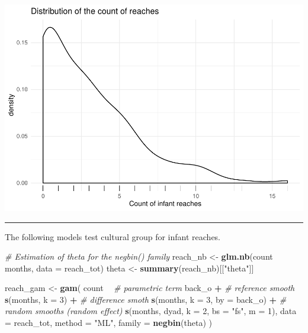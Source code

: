 \documentclass[]{article}
\newenvironment{Shaded}{\begin{snugshade}}{\end{snugshade}}
\newcommand{\CommentTok}[1]{\textcolor[rgb]{0.56,0.35,0.01}{\textit{#1}}}
\newcommand{\DataTypeTok}[1]{\textcolor[rgb]{0.13,0.29,0.53}{#1}}
\newcommand{\DecValTok}[1]{\textcolor[rgb]{0.00,0.00,0.81}{#1}}
\newcommand{\KeywordTok}[1]{\textcolor[rgb]{0.13,0.29,0.53}{\textbf{#1}}}
\newcommand{\NormalTok}[1]{#1}
\newcommand{\OperatorTok}[1]{\textcolor[rgb]{0.81,0.36,0.00}{\textbf{#1}}}
\newcommand{\StringTok}[1]{\textcolor[rgb]{0.31,0.60,0.02}{#1}}
\begin{document}
\includegraphics{supplement_files/figure-latex/reaches-1.pdf}

\begin{center}\rule{0.5\linewidth}{\linethickness}\end{center}

The following models test cultural group for infant reaches.

\begin{Shaded}
\begin{Highlighting}[]
\CommentTok{# Estimation of theta for the negbin() family}
\NormalTok{reach_nb <-}\StringTok{ }\KeywordTok{glm.nb}\NormalTok{(count }\OperatorTok{~}\StringTok{ }\NormalTok{months, }\DataTypeTok{data =}\NormalTok{ reach_tot)}
\NormalTok{theta <-}\StringTok{ }\KeywordTok{summary}\NormalTok{(reach_nb)[[}\StringTok{"theta"}\NormalTok{]]}

\NormalTok{reach_gam <-}\StringTok{ }\KeywordTok{gam}\NormalTok{(}
\NormalTok{  count }\OperatorTok{~}
\StringTok{    }\CommentTok{# parametric term}
\StringTok{    }\NormalTok{back_o }\OperatorTok{+}
\StringTok{    }\CommentTok{# reference smooth}
\StringTok{    }\KeywordTok{s}\NormalTok{(months, }\DataTypeTok{k =} \DecValTok{3}\NormalTok{) }\OperatorTok{+}
\StringTok{    }\CommentTok{# difference smoth}
\StringTok{    }\KeywordTok{s}\NormalTok{(months, }\DataTypeTok{k =} \DecValTok{3}\NormalTok{, }\DataTypeTok{by =}\NormalTok{ back_o) }\OperatorTok{+}
\StringTok{    }\CommentTok{# random smooths (random effect)}
\StringTok{    }\KeywordTok{s}\NormalTok{(months, dyad, }\DataTypeTok{k =} \DecValTok{2}\NormalTok{, }\DataTypeTok{bs =} \StringTok{"fs"}\NormalTok{, }\DataTypeTok{m =} \DecValTok{1}\NormalTok{),}
  \DataTypeTok{data =}\NormalTok{ reach_tot,}
  \DataTypeTok{method =} \StringTok{"ML"}\NormalTok{,}
  \DataTypeTok{family =} \KeywordTok{negbin}\NormalTok{(theta)}
\NormalTok{)}
\end{Highlighting}
\end{Shaded}
\end{document}
